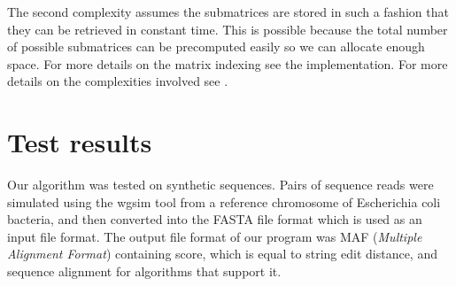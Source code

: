 \documentclass[times, utf8, seminar, numeric]{fer}
\begin{document}
The second complexity assumes the submatrices are stored in such a fashion that they can be retrieved in constant time. This is possible because the total number of possible submatrices can be precomputed easily so we can allocate enough space. For more details on the matrix indexing see the implementation. For more details on the complexities involved see \citep{gusfield1997algorithms}.

\chapter{Test results}
Our algorithm was tested on synthetic sequences. Pairs of sequence reads were simulated using the wgsim tool from a reference chromosome of Escherichia coli bacteria, and then converted into the FASTA file format which is used as an input file format. The output file format of our program was MAF (\textit{Multiple Alignment Format}) containing score, which is equal to string edit distance, and sequence alignment for algorithms that support it. 
\end{document}
